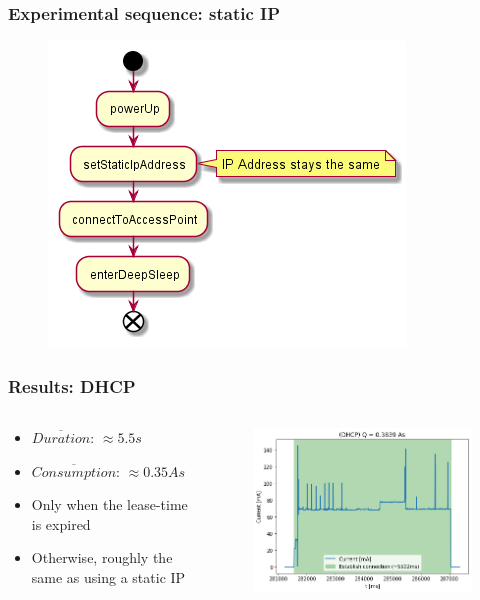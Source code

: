 \begin{frame}
    \frametitle{Experimental sequence: static IP}
    \begin{figure}
        \includegraphics[scale=0.6]{../paper/fig/sequence_static_ip.png}
    \end{figure}
\end{frame}

\begin{frame}
    \frametitle{Results: DHCP}
    \begin{columns}
        \begin{column}{0.35\textwidth}
            \begin{itemize}
                \item $\overline{Duration}$: $\approx5.5s$
                \item $\overline{Consumption}$: $\approx0.35As$
                \item Only when the lease-time is expired
                \item Otherwise, roughly the same as using a static IP
            \end{itemize}
        \end{column}
        \begin{column}{0.65\textwidth}
            \begin{figure}
                \includegraphics[scale=0.5]{../paper/fig/dhcp.png}
            \end{figure}
        \end{column}
    \end{columns}
\end{frame}

